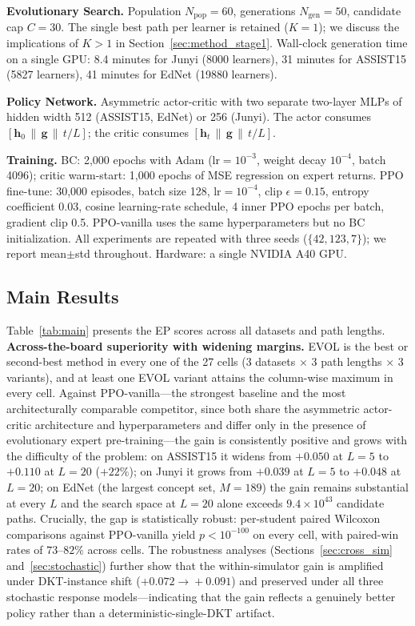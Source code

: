 \documentclass[sigconf,anonymous]{acmart}
\newcommand{\ours}{\textrm{EVOL}}
\begin{document}
\textbf{Evolutionary Search.} Population $N_{\text{pop}} = 60$, generations $N_{\text{gen}} = 50$, candidate cap $C = 30$. The single best path per learner is retained ($K=1$); we discuss the implications of $K>1$ in Section~\ref{sec:method_stage1}. Wall-clock generation time on a single GPU: 8.4 minutes for Junyi (8000 learners), 31 minutes for ASSIST15 (5827 learners), 41 minutes for EdNet (19880 learners).

\textbf{Policy Network.} Asymmetric actor-critic with two separate two-layer MLPs of hidden width 512 (ASSIST15, EdNet) or 256 (Junyi). The actor consumes $[\mathbf{h}_0\,\|\,\mathbf{g}\,\|\,t/L]$; the critic consumes $[\mathbf{h}_t\,\|\,\mathbf{g}\,\|\,t/L]$.

\textbf{Training.} BC: 2,000 epochs with Adam ($\text{lr}=10^{-3}$, weight decay $10^{-4}$, batch 4096); critic warm-start: 1,000 epochs of MSE regression on expert returns. PPO fine-tune: 30,000 episodes, batch size 128, $\text{lr}=10^{-4}$, clip $\epsilon=0.15$, entropy coefficient 0.03, cosine learning-rate schedule, 4 inner PPO epochs per batch, gradient clip 0.5. PPO-vanilla uses the same hyperparameters but no BC initialization. All experiments are repeated with three seeds ($\{42, 123, 7\}$); we report mean$\pm$std throughout. Hardware: a single NVIDIA A40 GPU.

\subsection{Main Results}

Table~\ref{tab:main} presents the EP scores across all datasets and path lengths.
\textbf{Across-the-board superiority with widening margins.}
\ours{} is the best or second-best method in every one of the 27 cells (3 datasets $\times$ 3 path lengths $\times$ 3 variants), and at least one \ours{} variant attains the column-wise maximum in every cell. Against PPO-vanilla---the strongest baseline and the most architecturally comparable competitor, since both share the asymmetric actor-critic architecture and hyperparameters and differ only in the presence of evolutionary expert pre-training---the gain is consistently positive and grows with the difficulty of the problem: on ASSIST15 it widens from $+0.050$ at $L\!=\!5$ to $+0.110$ at $L\!=\!20$ ($+22\%$); on Junyi it grows from $+0.039$ at $L\!=\!5$ to $+0.048$ at $L\!=\!20$; on EdNet (the largest concept set, $M\!=\!189$) the gain remains substantial at every $L$ and the search space at $L\!=\!20$ alone exceeds $9.4\!\times\!10^{43}$ candidate paths. Crucially, the gap is statistically robust: per-student paired Wilcoxon comparisons against PPO-vanilla yield $p\!<\!10^{-100}$ on every cell, with paired-win rates of $73$--$82\%$ across cells. The robustness analyses (Sections~\ref{sec:cross_sim} and~\ref{sec:stochastic}) further show that the within-simulator gain is amplified under DKT-instance shift ($+0.072\!\to\!+0.091$) and preserved under all three stochastic response models---indicating that the gain reflects a genuinely better policy rather than a deterministic-single-DKT artifact.
\end{document}
